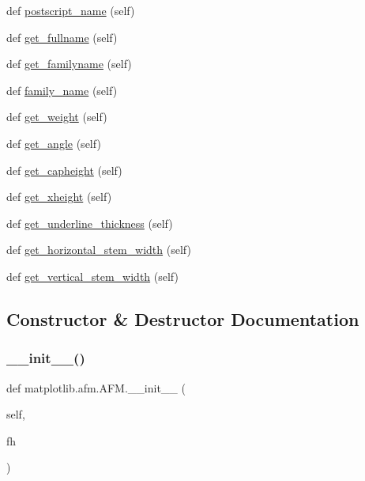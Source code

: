 \begin{DoxyCompactItemize}
\item 
def \hyperlink{classmatplotlib_1_1afm_1_1AFM_a8bf75973af64978e5cd775c8434d00f5}{postscript\+\_\+name} (self)
\item 
def \hyperlink{classmatplotlib_1_1afm_1_1AFM_a0f3e91ce75f8454445cd285ed849a268}{get\+\_\+fullname} (self)
\item 
def \hyperlink{classmatplotlib_1_1afm_1_1AFM_ab571740be829d14c1d6e20fb612e50f0}{get\+\_\+familyname} (self)
\item 
def \hyperlink{classmatplotlib_1_1afm_1_1AFM_ab921d894770a70f900e4a5f9e274e058}{family\+\_\+name} (self)
\item 
def \hyperlink{classmatplotlib_1_1afm_1_1AFM_a531897e4dfe83cd6938309f58d458996}{get\+\_\+weight} (self)
\item 
def \hyperlink{classmatplotlib_1_1afm_1_1AFM_a62ffe925f31812648ede60117bca8072}{get\+\_\+angle} (self)
\item 
def \hyperlink{classmatplotlib_1_1afm_1_1AFM_a08d93b650a4c492129ad0eb2647ac614}{get\+\_\+capheight} (self)
\item 
def \hyperlink{classmatplotlib_1_1afm_1_1AFM_aa7749e22883479a2451c750cb39e81fd}{get\+\_\+xheight} (self)
\item 
def \hyperlink{classmatplotlib_1_1afm_1_1AFM_aa822c324cadb07c524b68299f5c9b1fb}{get\+\_\+underline\+\_\+thickness} (self)
\item 
def \hyperlink{classmatplotlib_1_1afm_1_1AFM_aa1235f6a072bd824a574fd1bc12a73a6}{get\+\_\+horizontal\+\_\+stem\+\_\+width} (self)
\item 
def \hyperlink{classmatplotlib_1_1afm_1_1AFM_af9d2666fecd446c7e92dd3e5b3d5a475}{get\+\_\+vertical\+\_\+stem\+\_\+width} (self)
\end{DoxyCompactItemize}


\subsection{Constructor \& Destructor Documentation}
\mbox{\label{classmatplotlib_1_1afm_1_1AFM_a4957a05d65a88f5c485ccc20a6548229}} 
\subsubsection{\texorpdfstring{\+\_\+\+\_\+init\+\_\+\+\_\+()}{\_\_init\_\_()}}
{\footnotesize\ttfamily def matplotlib.\+afm.\+A\+F\+M.\+\_\+\+\_\+init\+\_\+\+\_\+ (\begin{DoxyParamCaption}\item[{}]{self,  }\item[{}]{fh }\end{DoxyParamCaption})}

